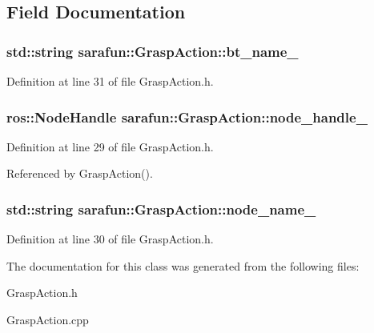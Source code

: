 \subsection{Field Documentation}
\hypertarget{classsarafun_1_1GraspAction_a3c06e926769370c2e80f864f8f36b958_a3c06e926769370c2e80f864f8f36b958}{
\subsubsection[{bt\-\_\-name\-\_\-}]{\setlength{\rightskip}{0pt plus 5cm}std\-::string sarafun\-::\-Grasp\-Action\-::bt\-\_\-name\-\_\-\hspace{0.3cm}{\ttfamily [private]}}}\label{classsarafun_1_1GraspAction_a3c06e926769370c2e80f864f8f36b958_a3c06e926769370c2e80f864f8f36b958}


Definition at line 31 of file Grasp\-Action.\-h.

\hypertarget{classsarafun_1_1GraspAction_a4b39e13eba27c71ee0d2cce0243b3e08_a4b39e13eba27c71ee0d2cce0243b3e08}{
\subsubsection[{node\-\_\-handle\-\_\-}]{\setlength{\rightskip}{0pt plus 5cm}ros\-::\-Node\-Handle sarafun\-::\-Grasp\-Action\-::node\-\_\-handle\-\_\-\hspace{0.3cm}{\ttfamily [private]}}}\label{classsarafun_1_1GraspAction_a4b39e13eba27c71ee0d2cce0243b3e08_a4b39e13eba27c71ee0d2cce0243b3e08}


Definition at line 29 of file Grasp\-Action.\-h.



Referenced by Grasp\-Action().

\hypertarget{classsarafun_1_1GraspAction_afd7e5985ad75e7b94ccd3190243d9df2_afd7e5985ad75e7b94ccd3190243d9df2}{
\subsubsection[{node\-\_\-name\-\_\-}]{\setlength{\rightskip}{0pt plus 5cm}std\-::string sarafun\-::\-Grasp\-Action\-::node\-\_\-name\-\_\-\hspace{0.3cm}{\ttfamily [private]}}}\label{classsarafun_1_1GraspAction_afd7e5985ad75e7b94ccd3190243d9df2_afd7e5985ad75e7b94ccd3190243d9df2}


Definition at line 30 of file Grasp\-Action.\-h.



The documentation for this class was generated from the following files\-:\begin{DoxyCompactItemize}
\item 
Grasp\-Action.\-h\item 
Grasp\-Action.\-cpp\end{DoxyCompactItemize}
